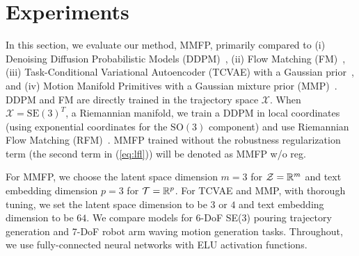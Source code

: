 \section{Experiments}
\label{sec:experiments}
In this section, we evaluate our method, MMFP, primarily compared to (i) Denoising Diffusion Probabilistic Models (DDPM)~\cite{ho2020denoising}, (ii) Flow Matching (FM)~\cite{lipman2022flow}, (iii) Task-Conditional Variational Autoencoder (TCVAE) with a Gaussian prior~\cite{noseworthy2020task}, and (iv) Motion Manifold Primitives with a Gaussian mixture prior (MMP)~\cite{lee2023equivariant}.  
DDPM and FM are directly trained in the trajectory space \(\mathcal{X}\). When \(\mathcal{X} = \mathrm{SE}(3)^T\), a Riemannian manifold, we train a DDPM in local coordinates (using exponential coordinates for the $\mathrm{SO}(3)$ component) and use Riemannian Flow Matching (RFM)~\cite{chen2023riemannian}.  
MMFP trained without the robustness regularization term (the second term in (\ref{eq:lfl})) will be denoted as MMFP w/o reg.

For MMFP, we choose the latent space dimension $m=3$ for ${\cal Z} = \mathbb{R}^{m}$ and text embedding dimension $p=3$ for ${\cal T}=\mathbb{R}^{p}$. For TCVAE and MMP, with thorough tuning, we set the latent space dimension to be $3$ or $4$ and text embedding dimension to be $64$.
We compare models for 6-DoF SE(3) pouring trajectory generation and 7-DoF robot arm waving motion generation tasks. 
Throughout, we use fully-connected neural networks with ELU activation functions.

